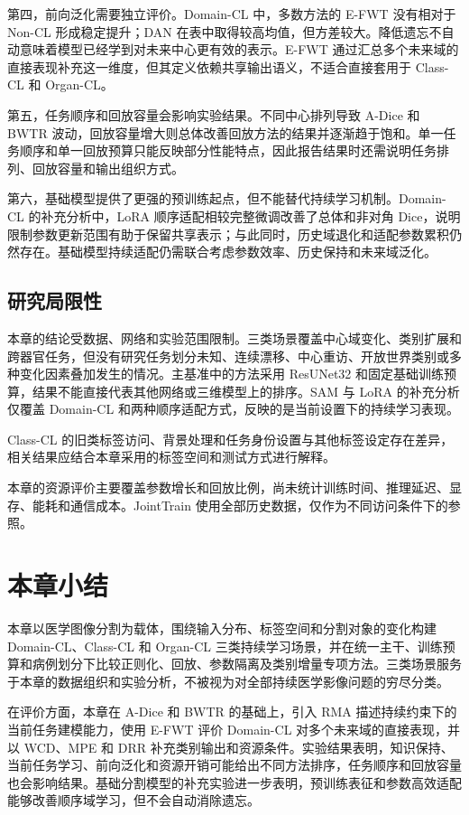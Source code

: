 第四，前向泛化需要独立评价。Domain-CL 中，多数方法的 E-FWT 没有相对于 Non-CL 形成稳定提升；DAN 在表中取得较高均值，但方差较大。降低遗忘不自动意味着模型已经学到对未来中心更有效的表示。E-FWT 通过汇总多个未来域的直接表现补充这一维度，但其定义依赖共享输出语义，不适合直接套用于 Class-CL 和 Organ-CL。

第五，任务顺序和回放容量会影响实验结果。不同中心排列导致 A-Dice 和 BWTR 波动，回放容量增大则总体改善回放方法的结果并逐渐趋于饱和。单一任务顺序和单一回放预算只能反映部分性能特点，因此报告结果时还需说明任务排列、回放容量和输出组织方式。

第六，基础模型提供了更强的预训练起点，但不能替代持续学习机制。Domain-CL 的补充分析中，LoRA 顺序适配相较完整微调改善了总体和非对角 Dice，说明限制参数更新范围有助于保留共享表示；与此同时，历史域退化和适配参数累积仍然存在。基础模型持续适配仍需联合考虑参数效率、历史保持和未来域泛化。

\subsection*{研究局限性}

本章的结论受数据、网络和实验范围限制。三类场景覆盖中心域变化、类别扩展和跨器官任务，但没有研究任务划分未知、连续漂移、中心重访、开放世界类别或多种变化因素叠加发生的情况。主基准中的方法采用 ResUNet32 和固定基础训练预算，结果不能直接代表其他网络或三维模型上的排序。SAM 与 LoRA 的补充分析仅覆盖 Domain-CL 和两种顺序适配方式，反映的是当前设置下的持续学习表现。

Class-CL 的旧类标签访问、背景处理和任务身份设置与其他标签设定存在差异，相关结果应结合本章采用的标签空间和测试方式进行解释。

本章的资源评价主要覆盖参数增长和回放比例，尚未统计训练时间、推理延迟、显存、能耗和通信成本。JointTrain 使用全部历史数据，仅作为不同访问条件下的参照。


\section{本章小结}
\label{sec:benchmark-summary}

本章以医学图像分割为载体，围绕输入分布、标签空间和分割对象的变化构建 Domain-CL、Class-CL 和 Organ-CL 三类持续学习场景，并在统一主干、训练预算和病例划分下比较正则化、回放、参数隔离及类别增量专项方法。三类场景服务于本章的数据组织和实验分析，不被视为对全部持续医学影像问题的穷尽分类。

在评价方面，本章在 A-Dice 和 BWTR 的基础上，引入 RMA 描述持续约束下的当前任务建模能力，使用 E-FWT 评价 Domain-CL 对多个未来域的直接表现，并以 WCD、MPE 和 DRR 补充类别输出和资源条件。实验结果表明，知识保持、当前任务学习、前向泛化和资源开销可能给出不同方法排序，任务顺序和回放容量也会影响结果。基础分割模型的补充实验进一步表明，预训练表征和参数高效适配能够改善顺序域学习，但不会自动消除遗忘。

